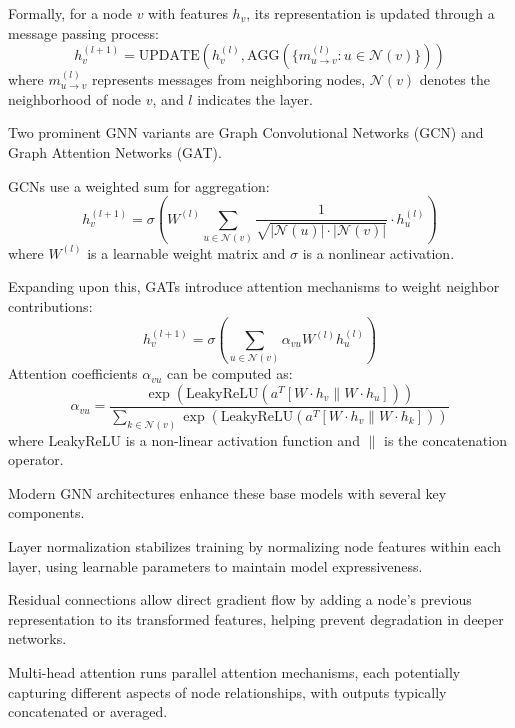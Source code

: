 \documentclass[letterpaper]{article}
\begin{document}
Formally, for a node $v$ with features $h_v$, its representation is updated through a message passing process:
\begin{equation*}
    h_v^{(l+1)} = \text{UPDATE}(h_v^{(l)}, \text{AGG}(\{m_{u\rightarrow v}^{(l)} : u \in \mathcal{N}(v)\}))
\end{equation*}
where $m_{u\rightarrow v}^{(l)}$ represents messages from neighboring nodes, $\mathcal{N}(v)$ denotes the neighborhood of node $v$, and $l$ indicates the layer.

Two prominent GNN variants are Graph Convolutional Networks (GCN) and Graph Attention Networks (GAT).

GCNs \citep{kipf2016semi} use a weighted sum for aggregation:
\begin{equation*}
    h_v^{(l+1)} = \sigma \left( W^{(l)} \sum_{u \in \mathcal{N}(v)} \frac{1}{\sqrt{|\mathcal{N}(u)|\cdot|\mathcal{N}(v)|}} \cdot h_u^{(l)} \right)
\end{equation*}
where $W^{(l)}$ is a learnable weight matrix and $\sigma$ is a nonlinear activation.

Expanding upon this, GATs \citep{velivckovic2017graph} introduce attention mechanisms to weight neighbor contributions:
\begin{equation*}
    h_v^{(l+1)} = \sigma \left( \sum_{u \in \mathcal{N}(v)} \alpha_{vu} W^{(l)} h_u^{(l)} \right)
\end{equation*}
Attention coefficients $\alpha_{vu}$ can be computed as:
\begin{equation*}
    \alpha_{vu} = \frac{\exp(\text{LeakyReLU}(a^T[W \cdot h_v \| W \cdot h_u]))}{\sum_{k \in \mathcal{N}(v)} \exp(\text{LeakyReLU}(a^T[W \cdot h_v \| W \cdot h_k]))}
\end{equation*}
where LeakyReLU is a non-linear activation function and $\|$ is the concatenation operator.

Modern GNN architectures enhance these base models with several key components.

Layer normalization stabilizes training by normalizing node features within each layer, using learnable parameters to maintain model expressiveness.

Residual connections allow direct gradient flow by adding a node's previous representation to its transformed features, helping prevent degradation in deeper networks.

Multi-head attention runs parallel attention mechanisms, each potentially capturing different aspects of node relationships, with outputs typically concatenated or averaged.
\end{document}
